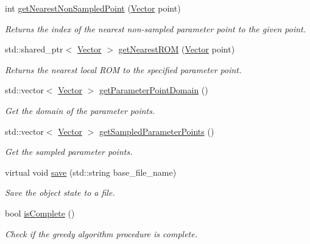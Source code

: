 \begin{DoxyCompactItemize}
int \hyperlink{class_c_a_r_o_m_1_1_greedy_parameter_point_sampler_ae48575a06abb40b0d29f67429d83f769}{get\-Nearest\-Non\-Sampled\-Point} (\hyperlink{class_c_a_r_o_m_1_1_vector}{Vector} point)
\begin{DoxyCompactList}\small\item\em Returns the index of the nearest non-\/sampled parameter point to the given point. \end{DoxyCompactList}\item 
std\-::shared\-\_\-ptr$<$ \hyperlink{class_c_a_r_o_m_1_1_vector}{Vector} $>$ \hyperlink{class_c_a_r_o_m_1_1_greedy_parameter_point_sampler_a1878076bba2ed20e5f52abff62759b3a}{get\-Nearest\-R\-O\-M} (\hyperlink{class_c_a_r_o_m_1_1_vector}{Vector} point)
\begin{DoxyCompactList}\small\item\em Returns the nearest local R\-O\-M to the specified parameter point. \end{DoxyCompactList}\item 
std\-::vector$<$ \hyperlink{class_c_a_r_o_m_1_1_vector}{Vector} $>$ \hyperlink{class_c_a_r_o_m_1_1_greedy_parameter_point_sampler_a0bfe93d32c6379173a5df115d05760dd}{get\-Parameter\-Point\-Domain} ()
\begin{DoxyCompactList}\small\item\em Get the domain of the parameter points. \end{DoxyCompactList}\item 
std\-::vector$<$ \hyperlink{class_c_a_r_o_m_1_1_vector}{Vector} $>$ \hyperlink{class_c_a_r_o_m_1_1_greedy_parameter_point_sampler_ad578be99cd96a78be0c5bd3d6724c86a}{get\-Sampled\-Parameter\-Points} ()
\begin{DoxyCompactList}\small\item\em Get the sampled parameter points. \end{DoxyCompactList}\item 
virtual void \hyperlink{class_c_a_r_o_m_1_1_greedy_parameter_point_sampler_a6ca108547601bbf32d4f56003c486500}{save} (std\-::string base\-\_\-file\-\_\-name)
\begin{DoxyCompactList}\small\item\em Save the object state to a file. \end{DoxyCompactList}\item 
bool \hyperlink{class_c_a_r_o_m_1_1_greedy_parameter_point_sampler_a6d0c5e50ec6da782ad2a3317b92eaf9c}{is\-Complete} ()
\begin{DoxyCompactList}\small\item\em Check if the greedy algorithm procedure is complete. \end{DoxyCompactList}\end{DoxyCompactItemize}
